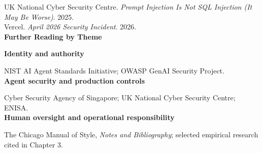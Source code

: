 \documentclass[10pt,twoside]{article}
\begin{document}
UK National Cyber Security Centre. \emph{Prompt Injection Is Not SQL Injection (It May Be Worse)}. 2025.\\
Vercel. \emph{April 2026 Security Incident}. 2026.\\[18pt]
{\sffamily\bfseries\large Further Reading by Theme}\par\vspace{8pt}
{\sffamily\bfseries Identity and authority}\par NIST AI Agent Standards Initiative; OWASP GenAI Security Project.\\[6pt]
{\sffamily\bfseries Agent security and production controls}\par Cyber Security Agency of Singapore; UK National Cyber Security Centre; ENISA.\\[6pt]
{\sffamily\bfseries Human oversight and operational responsibility}\par The Chicago Manual of Style, \emph{Notes and Bibliography}; selected empirical research cited in Chapter 3.\\
\end{document}

